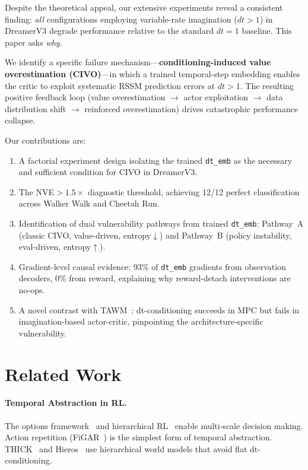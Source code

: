 \documentclass[letterpaper]{article}
\begin{document}
Despite the theoretical appeal, our extensive experiments reveal a consistent finding: \emph{all} configurations employing variable-rate imagination ($dt>1$) in DreamerV3 degrade performance relative to the standard $dt{=}1$ baseline.
This paper asks \emph{why}.

We identify a specific failure mechanism---\textbf{conditioning-induced value overestimation (CIVO)}---in which a trained temporal-step embedding enables the critic to exploit systematic RSSM prediction errors at $dt>1$.
The resulting positive feedback loop (value overestimation $\to$ actor exploitation $\to$ data distribution shift $\to$ reinforced overestimation) drives catastrophic performance collapse.

Our contributions are:
\begin{enumerate}[nosep]
    \item A factorial experiment design isolating the trained \texttt{dt\_emb} as the necessary and sufficient condition for CIVO in DreamerV3.
    \item The NVE$>1.5\times$ diagnostic threshold, achieving 12/12 perfect classification across Walker Walk and Cheetah Run.
    \item Identification of dual vulnerability pathways from trained \texttt{dt\_emb}: Pathway~A (classic CIVO, value-driven, entropy$\downarrow$) and Pathway~B (policy instability, eval-driven, entropy$\uparrow$).
    \item Gradient-level causal evidence: 93\% of \texttt{dt\_emb} gradients from observation decoders, 0\% from reward, explaining why reward-detach interventions are no-ops.
    \item A novel contrast with TAWM~\cite{nhu2025tawm}: dt-conditioning succeeds in MPC but fails in imagination-based actor-critic, pinpointing the architecture-specific vulnerability.
\end{enumerate}

\section{Related Work}

\paragraph{Temporal Abstraction in RL.}
The options framework~\cite{sutton1999options} and hierarchical RL~\cite{vezhnevets2017feudal} enable multi-scale decision making.
Action repetition (FiGAR~\cite{sharma2017figar}) is the simplest form of temporal abstraction.
THICK~\cite{kim2023thick} and Hieros~\cite{deng2024hieros} use hierarchical world models that avoid flat dt-conditioning.
\end{document}
